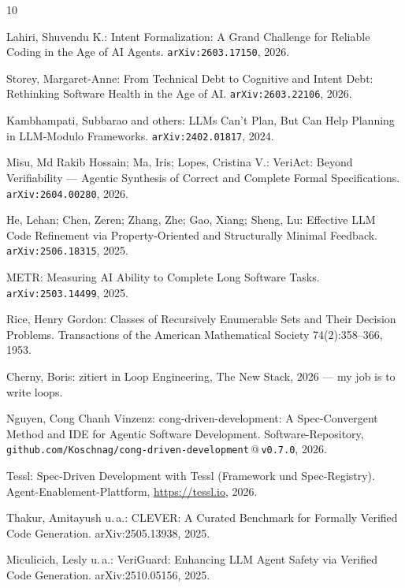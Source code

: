 \documentclass[11pt,a4paper]{article}
\theoremstyle{definition}
\theoremstyle{remark}
\begin{document}
\begin{thebibliography}{10}

Lahiri, Shuvendu K.:
\newblock Intent Formalization: A Grand Challenge for Reliable Coding in the Age
of AI Agents.
\newblock \texttt{arXiv:2603.17150}, 2026.

Storey, Margaret-Anne:
\newblock From Technical Debt to Cognitive and Intent Debt: Rethinking Software
Health in the Age of AI.
\newblock \texttt{arXiv:2603.22106}, 2026.

Kambhampati, Subbarao and others:
\newblock LLMs Can't Plan, But Can Help Planning in LLM-Modulo Frameworks.
\newblock \texttt{arXiv:2402.01817}, 2024.

Misu, Md Rakib Hossain; Ma, Iris; Lopes, Cristina V.:
\newblock VeriAct: Beyond Verifiability --- Agentic Synthesis of Correct and
Complete Formal Specifications.
\newblock \texttt{arXiv:2604.00280}, 2026.

He, Lehan; Chen, Zeren; Zhang, Zhe; Gao, Xiang; Sheng, Lu:
\newblock Effective LLM Code Refinement via Property-Oriented and Structurally
Minimal Feedback.
\newblock \texttt{arXiv:2506.18315}, 2025.

METR:
\newblock Measuring AI Ability to Complete Long Software Tasks.
\newblock \texttt{arXiv:2503.14499}, 2025.

Rice, Henry Gordon:
\newblock Classes of Recursively Enumerable Sets and Their Decision Problems.
\newblock Transactions of the American Mathematical Society 74(2):358--366, 1953.

Cherny, Boris:
\newblock zitiert in \glqq Loop Engineering\grqq, The New Stack, 2026 ---
\glqq my job is to write loops\grqq.

Nguyen, Cong Chanh Vinzenz:
\newblock cong-driven-development: A Spec-Convergent Method and IDE for Agentic
Software Development.
\newblock Software-Repository, \texttt{github.com/Koschnag/cong-driven-development}\,@\,\texttt{v0.7.0}, 2026.

Tessl:
\newblock Spec-Driven Development with Tessl (Framework und Spec-Registry).
\newblock Agent-Enablement-Plattform, \url{https://tessl.io}, 2026.

Thakur, Amitayush u.\,a.:
\newblock CLEVER: A Curated Benchmark for Formally Verified Code Generation.
\newblock arXiv:2505.13938, 2025.

Miculicich, Lesly u.\,a.:
\newblock VeriGuard: Enhancing LLM Agent Safety via Verified Code Generation.
\newblock arXiv:2510.05156, 2025.

\end{thebibliography}
\end{document}
